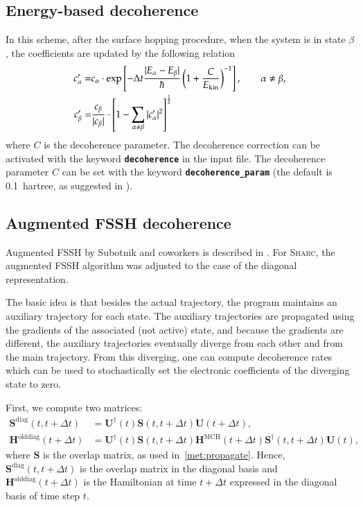 \documentclass[a4paper,10pt,DIV=15,openany]{scrbook}
\newcommand{\sharc}{\textsc{Sharc}}
\newcommand{\ttt}[1]{\textbf{\texttt{#1}}}
\newcommand{\VEC}[1]{\ensuremath{\mathbf{#1}}}
\begin{document}
\subsection{Energy-based decoherence}

In this scheme, after the surface hopping procedure, when the system is in state $\beta$, the coefficients are updated by the following relation
\begin{align}
  c_\alpha^\prime=&
  c_\alpha\cdot\exp
  \left[
    -\Delta t\frac{|E_\alpha-E_\beta|}{\hbar}
    \left(
      1+\frac{C}{E_{\text{kin}}}
    \right)^{-1}
  \right],\qquad \alpha\neq\beta,\\
  c_\beta^\prime=&
  \frac{c_\beta}{|c_\beta|}\cdot
  \left[
    1-\sum\limits_{\alpha\neq\beta}^{\vphantom{\alpha}} |c^\prime_\alpha|^2
  \right]^{\frac{1}{2}}
\end{align}
where $C$ is the decoherence parameter. The decoherence correction can be activated with the keyword \ttt{decoherence} in the input file. The decoherence parameter $C$ can be set with the keyword \ttt{decoherence\_param} (the default is 0.1~hartree, as suggested in \cite{Granucci2010JCP}).



\subsection{Augmented FSSH decoherence}

Augmented FSSH by Subotnik and coworkers is described in \cite{Jain2016JCTC}.
For \sharc, the augmented FSSH algorithm was adjusted to the case of the diagonal representation.

The basic idea is that besides the actual trajectory, the program maintains an auxiliary trajectory for each state.
The auxiliary trajectories are propagated using the gradients of the associated (not active) state, and because the gradients are different, the auxiliary trajectories eventually diverge from each other and from the main trajectory.
From this diverging, one can compute decoherence rates which can be used to stochastically set the electronic coefficients of the diverging state to zero.

First, we compute two matrices:
\begin{align}
  \VEC{S}^\text{diag}(t,t+\Delta t)&=\VEC{U}^\dagger(t)\VEC{S}(t,t+\Delta t)\VEC{U}(t+\Delta t),\\
  \VEC{H}^\text{olddiag}(t+\Delta t)&=\VEC{U}^\dagger(t)\VEC{S}(t,t+\Delta t)\VEC{H}^\text{MCH}(t+\Delta t)\VEC{S}^\dagger(t,t+\Delta t)\VEC{U}(t),
\end{align}
where $\VEC{S}$ is the overlap matrix, as used in~\ref{met:propagate}.
Hence, $\VEC{S}^\text{diag}(t,t+\Delta t)$ is the overlap matrix in the diagonal basis and $\VEC{H}^\text{olddiag}(t+\Delta t)$ is the Hamiltonian at time $t+\Delta t$ expressed in the diagonal basis of time step $t$.
\end{document}
